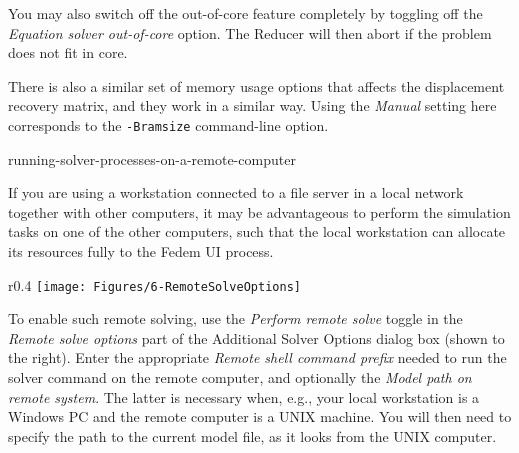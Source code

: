 You may also switch off the out-of-core feature completely by toggling off the
{\sl Equation solver out-of-core} option.
The Reducer will then abort if the problem does not fit in core.

There is also a similar set of memory usage options that affects the
displacement recovery matrix, and they work in a similar way. Using the
{\sl Manual} setting here corresponds to the {\tt-Bramsize} command-line option.


              {running-solver-processes-on-a-remote-computer}

If you are using a workstation connected to a file server in a local
network together with other computers, it may be advantageous to perform
the simulation tasks on one of the other computers, such that the local
workstation can allocate its resources fully to the Fedem UI process.

\begin{wrapfigure}{r}{0.4\textwidth}
  \texttt{[image: Figures/6-RemoteSolveOptions]}
\end{wrapfigure}

To enable such remote solving, use the {\sl Perform remote solve} toggle in the
{\sl Remote solve options} part of the Additional Solver Options dialog box
(shown to the right). Enter the appropriate {\sl Remote shell command prefix}
needed to run the solver command on the remote computer, and optionally the
{\sl Model path on remote system}.
The latter is necessary when, e.g., your local workstation is a Windows PC and
the remote computer is a UNIX machine. You will then need to specify the path to
the current model file, as it looks from the UNIX computer.


